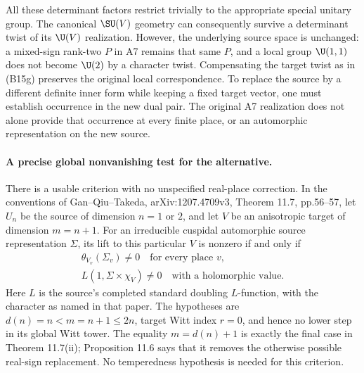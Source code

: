 All these determinant factors restrict trivially to the appropriate special unitary group. The canonical $\SU(V)$ geometry can consequently survive a determinant twist of its $\U(V)$ realization. However, the underlying source space is unchanged: a mixed-sign rank-two $P$ in A7 remains that same $P$, and a local group $\U(1,1)$ does not become $\U(2)$ by a character twist. Compensating the target twist as in (B15g) preserves the original local correspondence. To replace the source by a different definite inner form while keeping a fixed target vector, one must establish occurrence in the new dual pair. The original A7 realization does not alone provide that occurrence at every finite place, or an automorphic representation on the new source.

\paragraph{A precise global nonvanishing test for the alternative.}
There is a usable criterion with no unspecified real-place correction. In the conventions of Gan--Qiu--Takeda, arXiv:1207.4709v3, Theorem 11.7, pp.56--57, let $U_n$ be the source of dimension $n=1$ or $2$, and let $V$ be an anisotropic target of dimension $m=n+1$. For an irreducible cuspidal automorphic source representation $\Sigma$, its lift to this particular $V$ is nonzero if and only if
\begin{equation}
\begin{gathered}
 \theta_{V_v}(\Sigma_v)\ne0\quad\text{for every place }v,
 \\ L(1,\Sigma\times\chi_V)\ne0
       \quad\text{with a holomorphic value}.
\end{gathered}
 \tag{B15i}
\end{equation}
Here $L$ is the source's completed standard doubling $L$-function, with the character as named in that paper. The hypotheses are $d(n)=n<m=n+1\leq2n$, target Witt index $r=0$, and hence no lower step in its global Witt tower. The equality $m=d(n)+1$ is exactly the final case in Theorem 11.7(ii); Proposition 11.6 says that it removes the otherwise possible real-sign replacement. No temperedness hypothesis is needed for this criterion.

